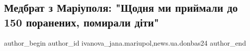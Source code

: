  
 
 
 
 
 
\subsection{Медбрат з Маріуполя: "Щодня ми приймали до 150 поранених, помирали діти"}
\label{sec:13_08_2022.stz.news.ua.donbas24.3.medbrat_z_mrpl}
 
\ifcmt
 author_begin
   author_id ivanova_jana.mariupol,news.ua.donbas24
 author_end
\fi
